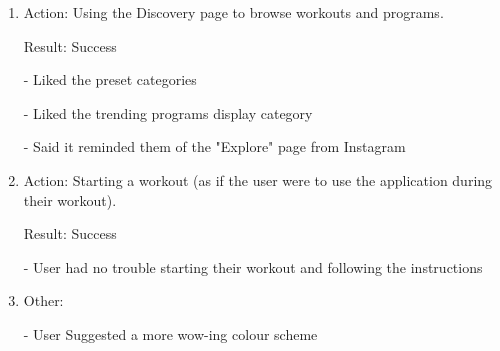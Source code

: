 \documentclass[12pt, titlepage]{article}
\begin{document}
\begin{enumerate}
	\item Action: Using the Discovery page to browse workouts and programs.
	
	Result: Success
	
	-	Liked the preset categories
	
	-	Liked the trending programs display category
	
	-	Said it reminded them of the "Explore" page from Instagram
	
	
	\item Action: Starting a workout (as if the user were to use the application during their workout).
	
	Result: Success
	
	-	User had no trouble starting their workout and following the instructions
	
\item Other: 

- User Suggested a more wow-ing colour scheme
\end{enumerate}
\end{document}
